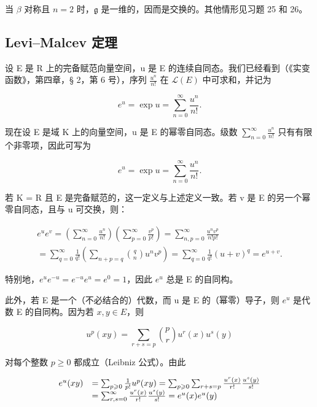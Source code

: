 当 \(\beta\) 对称且 \(n = 2\) 时，\(\mathfrak{g}\) 是一维的，因而是交换的。其他情形见习题 25 和 26。

\subsection{Levi--Malcev 定理}

设 E 是 R 上的完备赋范向量空间，u 是 E 的连续自同态。我们已经看到（《实变函数》，第四章，§ 2，第 6 号），序列 \(\frac{u^{n}}{n!}\) 在 \(\mathcal{L}(E)\) 中可求和，并记为

\[
e ^ {u} = \exp u = \sum_ {n = 0} ^ {\infty} \frac {u ^ {n}}{n !}.
\]

现在设 E 是域 K 上的向量空间，u 是 E 的幂零自同态。级数 \(\sum_{n=0}^{\infty}\frac{u^{n}}{n!}\) 只有有限个非零项，因此可写为

\[
e ^ {u} = \exp u = \sum_ {n = 0} ^ {\infty} \frac {u ^ {n}}{n !}.
\]

若 K = R 且 E 是完备赋范的，这一定义与上述定义一致。若 v 是 E 的另一个幂零自同态，且与 u 可交换，则：

\[
\begin{array}{l} e ^ {u} e ^ {v} = \left(\sum_ {n = 0} ^ {\infty} \frac {u ^ {n}}{n !}\right) \left(\sum_ {p = 0} ^ {\infty} \frac {v ^ {p}}{p !}\right) = \sum_ {n, p = 0} ^ {\infty} \frac {u ^ {n} v ^ {p}}{n ! p !} \\ = \sum_ {q = 0} ^ {\infty} \frac {1}{q !} \left(\sum_ {n + p = q} \binom {q} {n} u ^ {n} v ^ {p}\right) = \sum_ {q = 0} ^ {\infty} \frac {1}{q !} (u + v) ^ {q} = e ^ {u + v}. \end{array}\tag{3}
\]

特别地，\(e^u e^{-u} = e^{-u}e^u = e^0 = 1\)，因此 \(e^u\) 总是 E 的自同构。

此外，若 E 是一个（不必结合的）代数，而 u 是 E 的（幂零）导子，则 \(e^{u}\) 是代数 E 的自同构。因为若 \(x, y \in E\)，则

\[
u ^ {p} (x y) = \sum_ {r + s = p} \binom {p} {r} u ^ {r} (x) u ^ {s} (y)
\]

对每个整数 \(p \geqslant 0\) 都成立（Leibniz 公式）。由此

\[
\begin{array}{r l} e ^ {u} (x y) & = \sum_ {p \geqslant 0} \frac {1}{p !} u ^ {p} (x y) = \sum_ {p \geqslant 0} \sum_ {r + s = p} \frac {u ^ {r} (x)}{r !} \frac {u ^ {s} (y)}{s !} \\ & = \sum_ {r, s = 0} ^ {\infty} \frac {u ^ {r} (x)}{r !} \frac {u ^ {s} (y)}{s !} = e ^ {u} (x) e ^ {u} (y) \end{array}
\]

